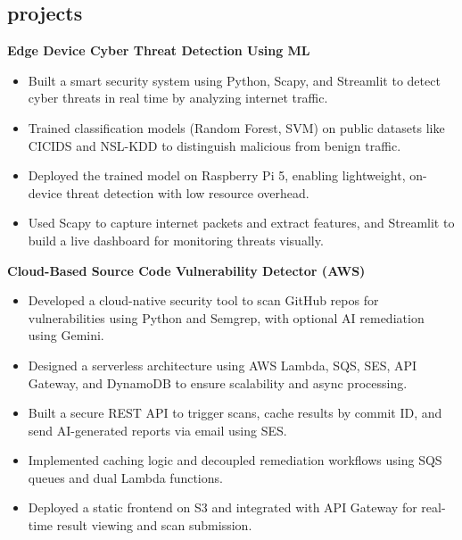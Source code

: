 \documentclass[12pt]{article}
\newcommand{\entry}[4]{{{\textbf{#1}}} \hfill #3 \\ #2 \hfill #4}
\begin{document}
\begin{paracol}{2}
		\section{projects}
		\begin{flushleft}
			\entry{Edge Device Cyber Threat Detection Using ML}{}{}{}
			\vspace{-16pt}
			\begin{itemize}[noitemsep,topsep=0pt,leftmargin=3.5mm,rightmargin=0mm,topsep=6pt]
				\item Built a smart security system using Python, Scapy, and Streamlit to detect cyber threats in real time by analyzing internet traffic.
				\item Trained classification models (Random Forest, SVM) on public datasets like CICIDS and NSL-KDD to distinguish malicious from benign traffic.
				\item Deployed the trained model on Raspberry Pi 5, enabling lightweight, on-device threat detection with low resource overhead.
				\item Used Scapy to capture internet packets and extract features, and Streamlit to build a live dashboard for monitoring threats visually.
			\end{itemize}
			\entry{Cloud-Based Source Code Vulnerability Detector (AWS)}{}{}{}
			\vspace{-16pt}
			\begin{itemize}[noitemsep,topsep=0pt,leftmargin=3.5mm,rightmargin=0mm]
				\item Developed a cloud-native security tool to scan GitHub repos for vulnerabilities using Python and Semgrep, with optional AI remediation using Gemini.
				\item Designed a serverless architecture using AWS Lambda, SQS, SES, API Gateway, and DynamoDB to ensure scalability and async processing.
				\item Built a secure REST API to trigger scans, cache results by commit ID, and send AI-generated reports via email using SES.
				\item Implemented caching logic and decoupled remediation workflows using SQS queues and dual Lambda functions.
				\item Deployed a static frontend on S3 and integrated with API Gateway for real-time result viewing and scan submission.
			\end{itemize}
			

\end{flushleft}
\end{paracol}
\end{document}
